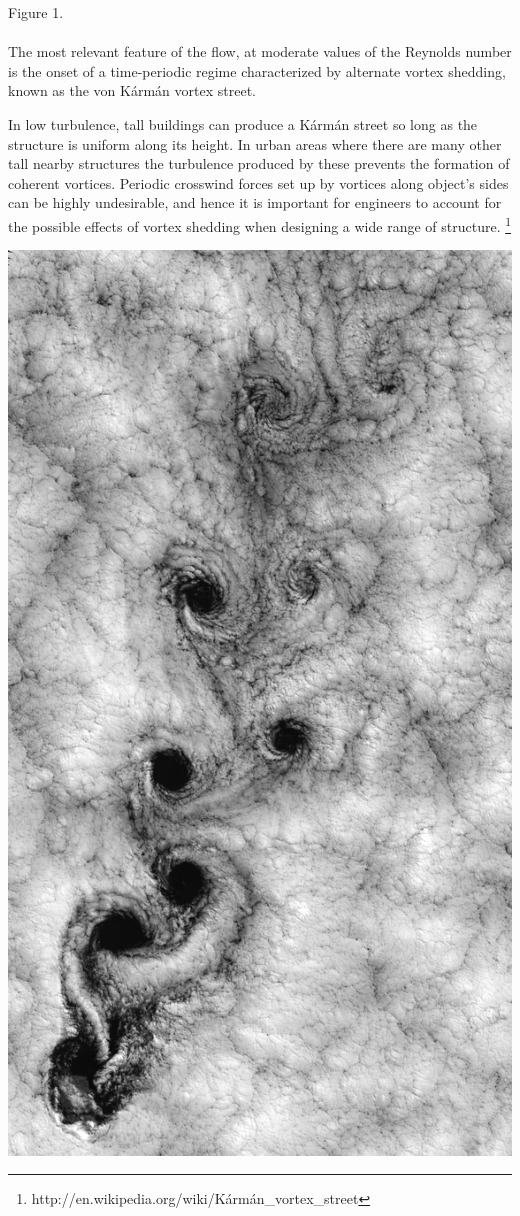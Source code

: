\documentclass[11pt]{article}
\begin{document}
{\vspace{-3mm}\hspace{60mm}Figure 1.\\\\
The most relevant feature of the flow, at moderate values of the Reynolds number is the 
onset of a time-periodic regime characterized by alternate vortex shedding, known as 
the von K\'arm\'an vortex street.

In low turbulence, tall buildings can produce a K\'arm\'an street so long as the structure 
is uniform along its height. In urban areas where there are many other tall nearby 
structures the turbulence produced by these prevents the formation of coherent vortices.
Periodic crosswind forces set up by vortices along object's sides can be highly undesirable, 
and hence it is important for engineers to account for the possible effects of vortex 
shedding when designing a wide range of structure.
\footnote{http://en.wikipedia.org/wiki/K\'arm\'an\_vortex\_street}

\hspace{35mm}\includegraphics[scale=0.06]{figures/vonKarmanStreetinNature.jpg}

}
\end{document}
